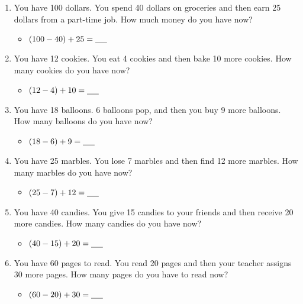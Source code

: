 \begin{enumerate}
\begin{itemize}
    \end{itemize}
    \item You have 100 dollars. You spend 40 dollars on groceries and then earn 25 dollars from a part-time job. How much money do you have now?
    \begin{itemize}
        \item $(100 - 40) + 25 = \underline{\hspace{0.5cm}}$
    \end{itemize}
    \item You have 12 cookies. You eat 4 cookies and then bake 10 more cookies. How many cookies do you have now?
    \begin{itemize}
        \item $(12 - 4) + 10 = \underline{\hspace{0.5cm}}$
    \end{itemize}
    \item You have 18 balloons. 6 balloons pop, and then you buy 9 more balloons. How many balloons do you have now?
    \begin{itemize}
        \item $(18 - 6) + 9 = \underline{\hspace{0.5cm}}$
    \end{itemize}
    \item You have 25 marbles. You lose 7 marbles and then find 12 more marbles. How many marbles do you have now?
    \begin{itemize}
        \item $(25 - 7) + 12 = \underline{\hspace{0.5cm}}$
    \end{itemize}
    \item You have 40 candies. You give 15 candies to your friends and then receive 20 more candies. How many candies do you have now?
    \begin{itemize}
        \item $(40 - 15) + 20 = \underline{\hspace{0.5cm}}$
    \end{itemize}
    \item You have 60 pages to read. You read 20 pages and then your teacher assigns 30 more pages. How many pages do you have to read now?
    \begin{itemize}
        \item $(60 - 20) + 30 = \underline{\hspace{0.5cm}}$
    \end{itemize}
\end{enumerate}

